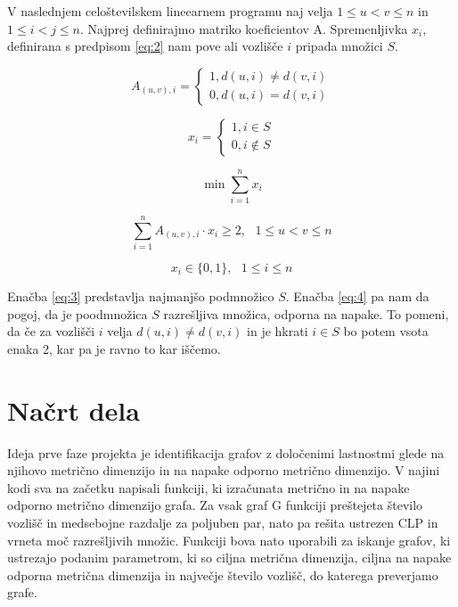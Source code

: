 \documentclass[a4paper,10pt, fleqn]{article}
\begin{document}
V naslednjem celoštevilskem lineearnem programu naj velja $1 \leq u < v \leq n$ in 
$1 \leq i < j \leq n.$ Najprej definirajmo matriko koeficientov A. Spremenljivka $x_i,$ 
definirana s predpisom \eqref{eq:2} nam pove ali vozlišče $i$ pripada množici $S.$ 

\begin{equation}
    A_{(u, v), i} = \begin{cases}
        1, d(u, i) \neq d(v, i) \\
        0, d(u, i) = d(v, i)
    \end{cases}
\label{eq:1}
\end{equation}

\begin{equation}
    x_i = \begin{cases}
        1, i \in S \\
        0, i \notin S
    \end{cases}
\label{eq:2}
\end{equation} 

\begin{equation}
    \min \sum_{i = 1}^{n} x_i  
\label{eq:3}
\end{equation}

\begin{equation}
    \sum_{i = 1}^{n} A_{(u, v), i} \cdot x_i \geq 2, \text{ } 1 \leq u < v \leq n 
\label{eq:4}
\end{equation}

\begin{equation}
    x_i \in \{0, 1\}, \text{ } 1 \leq i \leq n
\label{eq:5}
\end{equation}

Enačba \eqref{eq:3} predstavlja najmanjšo podmnožico $S.$ Enačba \eqref{eq:4} pa nam da pogoj, da
je poodmnožica $S$ razrešljiva množica, odporna na napake. To pomeni, da če za vozlišči $i$ velja 
$d(u, i) \neq d(v, i)$ in je hkrati $i \in S$ bo potem vsota enaka 2, kar pa je ravno to kar iščemo.

\section{Načrt dela}

Ideja prve faze projekta je identifikacija grafov z določenimi lastnostmi glede na njihovo metrično 
dimenzijo in na napake odporno metrično dimenzijo. V najini kodi sva na začetku napisali funkciji, 
ki izračunata metrično in na napake odporno metrično dimenzijo grafa. Za vsak graf G funkciji 
preštejeta število  vozlišč in medsebojne razdalje za poljuben par, nato pa rešita ustrezen CLP 
in vrneta moč razrešljivih množic. Funkciji bova nato uporabili za iskanje grafov, ki ustrezajo 
podanim parametrom, ki so ciljna metrična dimenzija, ciljna na napake odporna metrična dimenzija 
in največje število vozlišč, do katerega preverjamo grafe.
\end{document}
